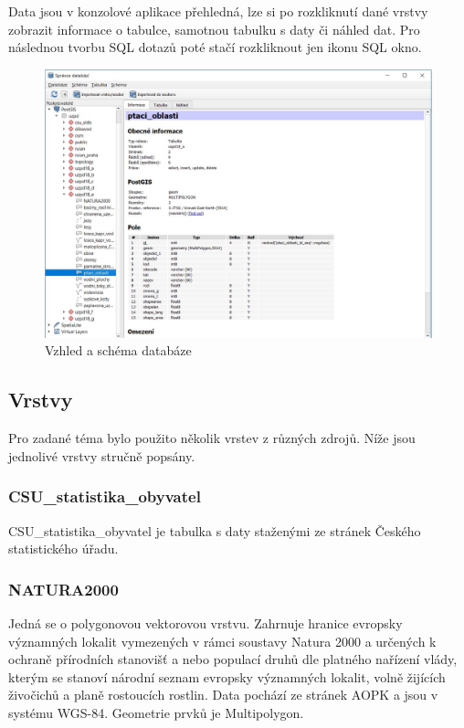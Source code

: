 \documentclass[a4paper, 12pt]{article}
\begin{document}
Data jsou v konzolové aplikace přehledná, lze si po rozkliknutí dané vrstvy zobrazit informace o tabulce, samotnou tabulku s daty či náhled dat. Pro následnou tvorbu SQL dotazů poté stačí rozkliknout jen ikonu SQL okno.

\begin{figure}[h!]
	\centering
	\includegraphics[width=15cm]{pictures/vzhled.jpg}
	\caption{Vzhled a schéma databáze}
\end{figure}

\subsection{Vrstvy}
Pro zadané téma bylo použito několik vrstev z různých zdrojů. Níže jsou jednolivé vrstvy stručně popsány.

\subsubsection{CSU\_statistika\_obyvatel}
CSU\_statistika\_obyvatel je tabulka s daty staženými ze stránek Českého statistického úřadu. 

\subsubsection{NATURA2000}
Jedná se o polygonovou vektorovou vrstvu. Zahrnuje hranice evropsky významných lokalit vymezených v rámci soustavy Natura 2000 a určených k ochraně přírodních stanovišť a nebo populací druhů dle platného nařízení vlády, kterým se stanoví národní seznam evropsky významných lokalit, volně žijících živočichů a planě rostoucích rostlin. Data pochází ze stránek AOPK a jsou v systému WGS-84. Geometrie prvků je Multipolygon.
\end{document}
